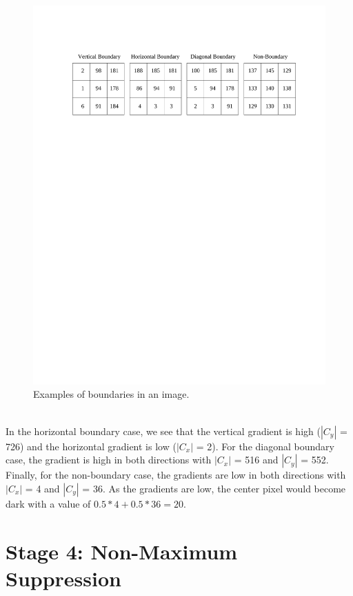 \documentclass[epsfig,10pt,fullpage]{article}
\begin{document}
\begin{figure}[H]
   \begin{center}
       \includegraphics[scale = 0.80]{figures/fig_image_boundaries.pdf}
   \end{center}
   \caption{Examples of boundaries in an image.}
	\label{fig:image_boundaries}
\end{figure}

~\\
\noindent
In the horizontal boundary case, we see that the vertical gradient is high ($|C_y|$ = 726) and the horizontal gradient is low ($|C_x|$ =  2). For the diagonal boundary case, the gradient is high in both directions with $|C_x|$ = 516 and $|C_y|$ = 552. Finally, for the non-boundary case, the gradients are low in both directions with $|C_x|$ = 4 and $|C_y|$ = 36. As the gradients are low, the center pixel would become dark with a value of $0.5*4 + 0.5*36 = 20$.

\noindent
\section*{Stage 4: Non-Maximum Suppression} 
\end{document}
